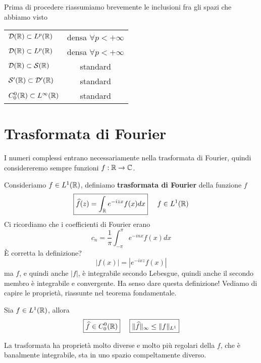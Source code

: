 Prima di procedere riassumiamo brevemente le inclusioni fra gli spazi che abbiamo visto

\begin{center}

\begin{tabular}{lc}
$\mathcal{D}(\mathbb{R}) \subset L^{p}(\mathbb{R})$ & densa $\forall p < + \infty $ \\
$\mathcal{D}(\mathbb{R}) \subset L^{p}(\mathbb{R})$ & densa $\forall p < + \infty $ \\
$\mathcal{D}(\mathbb{R}) \subset \mathcal{S}(\mathbb{R})$ & standard \\
$\mathcal{S}'(\mathbb{R}) \subset \mathcal{D}'(\mathbb{R})$ & standard \\
$C^{0}_{0}(\mathbb{R}) \subset L^{\infty}(\mathbb{R})$ & standard \\

\end{tabular}
\end{center}

\section{Trasformata di Fourier}

I numeri complessi entrano necessariamente nella trasformata di Fourier, quindi considereremo sempre funzioni $f: \mathbb{R}\rightarrow \mathbb{C}$.

Consideriamo $f\in L^{1}(\mathbb{R})$, definiamo \textbf{trasformata di Fourier} della funzione $f$
\begin{equation*}
\boxed{\widehat{f}(z) = \int_{\mathbb{R}} e^{- izx} f(x) dx} \ \ \ \ f\in L^{1}(\mathbb{R})
\end{equation*}
Ci ricordiamo che i coefficienti di Fourier erano
\begin{equation*}
c_{n} = \frac{1}{\pi}\int^{\pi}_{- \pi} e^{- inx} f(x) dx
\end{equation*}
È corretta la definizione?
\begin{equation*}
| f(x)| = \left| e^{- ixz} f(x)\right|
\end{equation*}
ma $f$, e quindi anche $| f| $, è integrabile secondo Lebesgue, quindi anche il secondo membro è integrabile e convergente. Ha senso dare questa definizione! Vediamo di capire le proprietà, riassunte nel teorema fondamentale.
\begin{thm}
 Sia $f\in L^{1}(\mathbb{R})$, allora
\begin{equation*}
\boxed{\hat{f} \in C^{0}_{0}(\RR)} \ \ \ \ \boxed{ \Vert \hat{f} \Vert_{\infty} \leq \Vert f \Vert_{L^{1}}}
\end{equation*}
\end{thm}
La trasformata ha proprietà molto diverse e molto più regolari della $f$, che è banalmente integrabile, sta in uno spazio compeltamente diverso.

